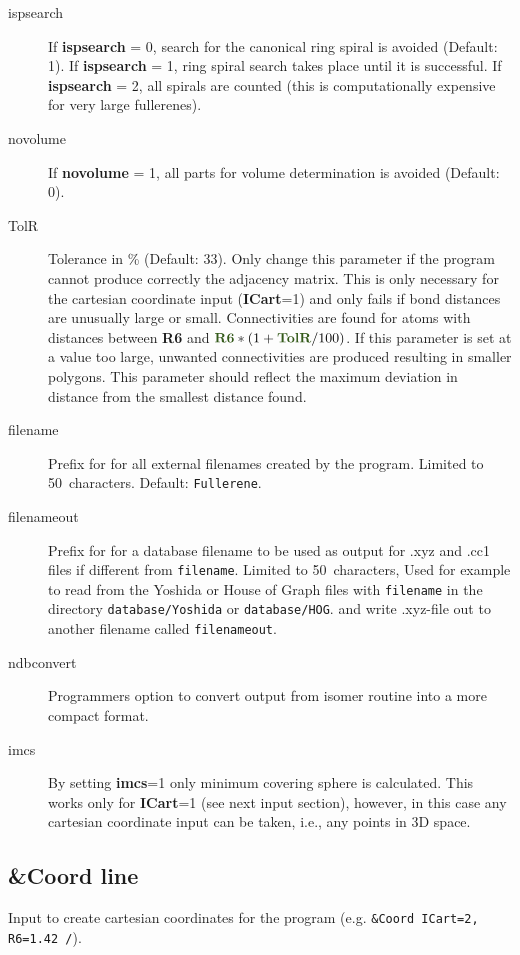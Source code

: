 \documentclass[article,a4paper,twoside]{memoir}
\newcommand{\filename}[1]{\texttt{#1}}
\newcommand{\paramname}[1]{{\color{green}\textbf{#1}}}
\begin{document}
\begin{description}
\item[{ispsearch}] If \paramname{ispsearch} = 0, search for the canonical ring spiral is avoided  (Default: 1). If \paramname{ispsearch} = 1, ring spiral search takes place
until it is successful. If \paramname{ispsearch} = 2, all spirals are counted (this is computationally expensive for very large fullerenes). 
\item[{novolume}] If \paramname{novolume} = 1, all parts for volume determination is avoided  (Default: 0).
\item[{TolR}] Tolerance in \% (Default: 33). Only change this parameter if the program cannot produce correctly the adjacency matrix. 
  This is only necessary for the cartesian coordinate input (\paramname{ICart}=1) and only fails if bond distances are unusually large or small. 
  Connectivities are found for atoms with distances between \paramname{R6} and $\paramname{R6}*(1+\paramname{TolR}/100)$. 
  If this parameter is set at a value too large, unwanted connectivities are produced resulting in smaller polygons. 
  This parameter should reflect the maximum deviation in distance from the smallest distance found.
\item[{filename}] 
    Prefix for for all external filenames created by the program. Limited to 50~characters. Default: \filename{Fullerene}.
\item[{filenameout}] 
    Prefix for for a database filename to be used as output for .xyz and .cc1 files if different from \filename{filename}. Limited to 50~characters, 
    Used for example to read from the Yoshida or House of Graph files with \filename{filename} in the directory \filename{database/Yoshida} or \filename{database/HOG}.
    and write .xyz-file out to another filename called \filename{filenameout}.
\item[{ndbconvert}] Programmers option to convert output from isomer routine into a more compact format.
\item[{imcs}] By setting \paramname{imcs}=1 only minimum covering sphere is calculated. This works only for \paramname{ICart}=1 (see next input section), however, in this case any cartesian coordinate input can be taken, i.e., any points in 3D space.
\end{description}


\subsection{\&Coord line}

Input to create cartesian coordinates for the program (e.g. \verb|&Coord ICart=2, R6=1.42 /|).
\end{document}
